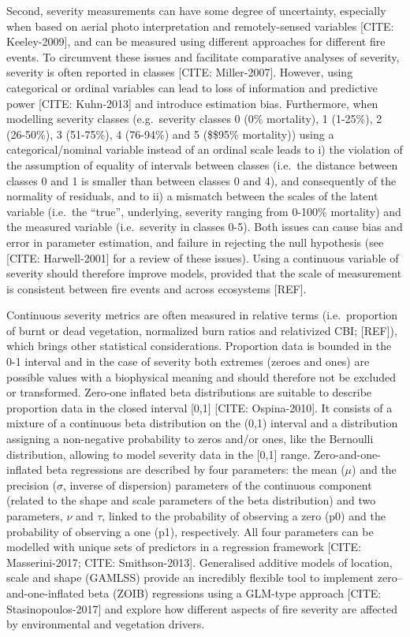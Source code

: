 \documentclass[
  numafflabel,
  authoryear,
  preprint]{elsarticle}
\begin{document}
Second, severity measurements can have some degree of uncertainty,
especially when based on aerial photo interpretation and remotely-sensed
variables {[}CITE: Keeley-2009{]}, and can be measured using different
approaches for different fire events. To circumvent these issues and
facilitate comparative analyses of severity, severity is often reported
in classes {[}CITE: Miller-2007{]}. However, using categorical or
ordinal variables can lead to loss of information and predictive power
{[}CITE: Kuhn-2013{]} and introduce estimation bias. Furthermore, when
modelling severity classes (e.g.~severity classes 0 (0\% mortality), 1
(1-25\%), 2 (26-50\%), 3 (51-75\%), 4 (76-94\%) and 5 (\$\geq\$95\%
mortality)) using a categorical/nominal variable instead of an ordinal
scale leads to i) the violation of the assumption of equality of
intervals between classes (i.e.~the distance between classes 0 and 1 is
smaller than between classes 0 and 4), and consequently of the normality
of residuals, and to ii) a mismatch between the scales of the latent
variable (i.e.~the ``true'', underlying, severity ranging from 0-100\%
mortality) and the measured variable (i.e.~severity in classes 0-5).
Both issues can cause bias and error in parameter estimation, and
failure in rejecting the null hypothesis (see {[}CITE: Harwell-2001{]}
for a review of these issues). Using a continuous variable of severity
should therefore improve models, provided that the scale of measurement
is consistent between fire events and across ecosystems {[}REF{]}.

Continuous severity metrics are often measured in relative terms
(i.e.~proportion of burnt or dead vegetation, normalized burn ratios and
relativized CBI; {[}REF{]}), which brings other statistical
considerations. Proportion data is bounded in the 0-1 interval and in
the case of severity both extremes (zeroes and ones) are possible values
with a biophysical meaning and should therefore not be excluded or
transformed. Zero-one inflated beta distributions are suitable to
describe proportion data in the closed interval {[}0,1{]} {[}CITE:
Ospina-2010{]}. It consists of a mixture of a continuous beta
distribution on the (0,1) interval and a distribution assigning a
non-negative probability to zeros and/or ones, like the Bernoulli
distribution, allowing to model severity data in the {[}0,1{]} range.
Zero-and-one-inflated beta regressions are described by four parameters:
the mean (\(\mu\)) and the precision (\(\sigma\), inverse of dispersion)
parameters of the continuous component (related to the shape and scale
parameters of the beta distribution) and two parameters, \(\nu\) and
\(\tau\), linked to the probability of observing a zero (p0) and the
probability of observing a one (p1), respectively. All four parameters
can be modelled with unique sets of predictors in a regression framework
{[}CITE: Masserini-2017; CITE: Smithson-2013{]}. Generalised additive
models of location, scale and shape (GAMLSS) provide an incredibly
flexible tool to implement zero--and-one-inflated beta (ZOIB)
regressions using a GLM-type approach {[}CITE: Stasinopoulos-2017{]} and
explore how different aspects of fire severity are affected by
environmental and vegetation drivers.
\end{document}
